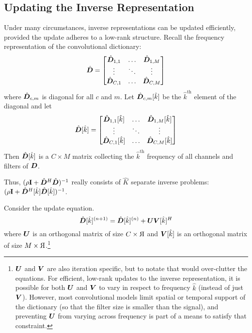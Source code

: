 \subsection{Updating the Inverse Representation}

Under many circumstances, inverse representations can be updated efficiently, provided the update adheres to a low-rank structure. Recall the frequency representation of the convolutional dictionary:
%
\begin{equation}
\hat{\bm{D}} = \begin{bmatrix}
\hat{\bm{D}}_{1,1} & \hdots & \hat{\bm{D}}_{1,M}\\
\vdots & \ddots & \vdots\\
\hat{\bm{D}}_{C,1} & \hdots & \hat{\bm{D}}_{C,M}
\end{bmatrix}
\end{equation}
%
where $\hat{\bm{D}}_{c,m}$ is diagonal for all $c$ and $m$. Let $\hat{\bm{D}}_{c,m}[\hat{k}]$ be the $\hat{k}^{\text{th}}$ element of the diagonal and let
%
\begin{equation}
\hat{\bm{D}}[\hat{k}] = \begin{bmatrix}
\hat{\bm{D}}_{1,1}[\hat{k}] & \hdots & \hat{\bm{D}}_{1,M}[\hat{k}]\\
\vdots & \ddots & \vdots\\
\hat{\bm{D}}_{C,1}[\hat{k}] & \hdots & \hat{\bm{D}}_{C,M}[\hat{k}]
\end{bmatrix}
\end{equation}
%
Then $\hat{\bm{D}}[\hat{k}]$ is a $C \times M$ matrix collecting the $\hat{k}^{\text{th}}$ frequency of all channels and filters of $\bm{D}$.

Thus, $(\rho{\bf I} + \hat{\bm{D}}^H\hat{\bm{D}})^{-1}$ really consists of $\hat{K}$ separate inverse problems: $(\rho{\bf I} + \hat{\bm{D}}^H[\hat{k}]\hat{\bm{D}}[\hat{k}])^{-1}$.

Consider the update equation.
%
\begin{equation}
\hat{\bm{D}}[\hat{k}]^{(n + 1)} = \hat{\bm{D}}[\hat{k}]^{(n)} + \bm{U}\bm{V}[\hat{k}]^H
\end{equation}
%
where $\bm{U}$ is an orthogonal matrix of size $C \times 
\reflectbox{R}$ and $\bm{V}[\hat{k}]$ is an orthogonal matrix of size $M \times 
\reflectbox{R}$.\footnote{$\bm{U}$ and $\bm{V}$ are also iteration specific, but to notate that would over-clutter the equations. For efficient, low-rank updates to the inverse representation, it is possible for both $\bm{U}$ and $\bm{V}$ to vary in respect to frequency $\hat{k}$ (instead of just $\bm{V}$). However, most convolutional models limit spatial or temporal support of the dictionary (so that the filter size is smaller than the signal), and preventing $\bm{U}$ from varying across frequency is part of a means to satisfy that constraint.}

